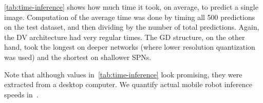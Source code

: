 \autoref{tab:time-inference} shows how much time it took, on average, to predict a single image.
Computation of the average time was done by timing all 500 predictions on the test dataset, and
then dividing by the number of total predictions.  Again, the DV architecture had very regular
times. The GD structure, on the other hand, took the longest on deeper networks (where lower
resolution quantization was used) and the shortest on shallower SPNs.

Note that although values in~\autoref{tab:time-inference} look promising, they were extracted from
a desktop computer. We quantify actual mobile robot inference speeds in~.
